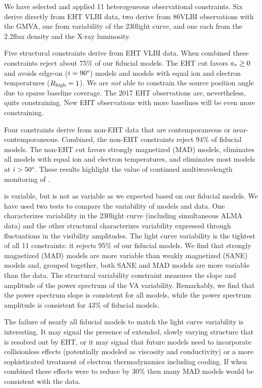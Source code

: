 We have selected and applied 11 heterogeneous observational constraints.
Six derive directly from EHT VLBI data, two derive from 86\GHz VLBI observations with the GMVA, one from variability of the 230\GHz light curve, and one each from the 2.2\um flux density and the X-ray luminosity.

Five structural constraints derive from EHT VLBI data.
When combined these constraints reject about 75\% of our fiducial models.
The EHT cut favors $a_* \ge 0$ and avoids edge-on ($i = 90\degree$) models and models with equal ion and electron temperatures ($R_\mathrm{high} = 1$).
We are {\em not} able to constrain the source position angle due to sparse baseline coverage.
The 2017 EHT observations are, nevertheless, quite constraining.  New EHT observations with more baselines will be even more constraining.

Four constraints derive from non-EHT data that are contemporaneous or near-contemporaneous.
Combined, the non-EHT constraints reject 94\% of fiducial models.
The non-EHT cut favors strongly magnetized (MAD) models, eliminates all models with equal ion and electron temperatures, and eliminates most models at $i > 50\degree$.
These results highlight the value of continued multiwavelength monitoring of \sgra.

\sgra is variable, but is not as variable as we expected based on our fiducial models.
We have used two tests to compare the variability of models and data.
One characterizes variability in the 230\GHz light curve (including simultaneous ALMA data) and the other structural characterizes variability expressed through fluctuations in the visibility amplitudes.
The light curve variability is the tightest of all 11 constraints: it rejects 95\% of our fiducial models.
We find that strongly magnetized (MAD) models are more variable than weakly magnetized (SANE) models and, grouped together, both SANE and MAD models are more variable than the data.
The structural variability constraint measures the slope and amplitude of the power spectrum of the VA variability.
Remarkably, we find that the power spectrum slope is consistent for all models, while the power spectrum amplitude is consistent for 43\% of fiducial models.

The failure of nearly all fiducial models to match the light curve variability is interesting.
It may signal the presence of extended, slowly varying structure that is resolved out by EHT, or it may signal that future models need to incorporate collisionless effects (potentially modeled as viscosity and conductivity) or a more sophisticated treatment of electron thermodynamics including cooling.  If when combined these effects were to reduce  by 30\% then many MAD models would be consistent with the data.  


